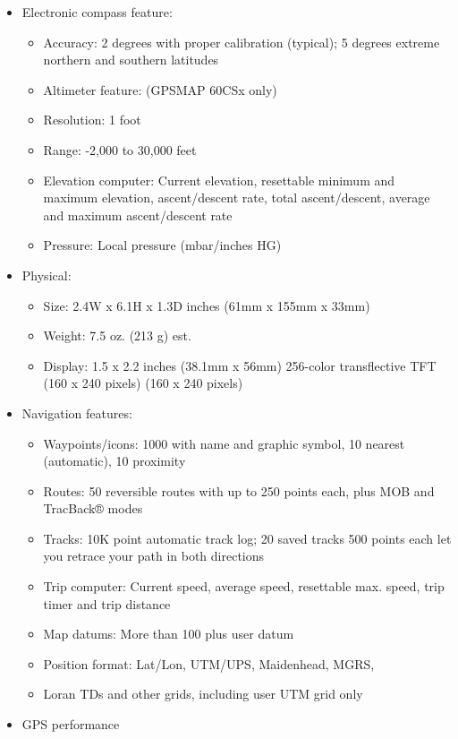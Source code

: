 \begin{itemize}
	\item Electronic compass feature:
		\begin{itemize}
			\item Accuracy: 2 degrees with proper calibration (typical); 5 degrees extreme northern and southern latitudes 
			\item Altimeter feature: (GPSMAP 60CSx only) 
			\item Resolution: 1 foot 
			\item Range: -2,000 to 30,000 feet 
			\item Elevation computer: Current elevation, resettable minimum and maximum elevation, ascent/descent rate, total ascent/descent, average and maximum ascent/descent rate 
			\item Pressure: Local pressure (mbar/inches HG) 
		\end{itemize}
	\item Physical:
		\begin{itemize}
			\item Size: 2.4W x 6.1H x 1.3D inches (61mm x 155mm x 33mm) 
			\item Weight: 7.5 oz. (213 g) est. 
			\item Display: 1.5 x 2.2 inches (38.1mm x 56mm) 256-color transflective TFT (160 x 240 pixels) (160 x 240 pixels) 
  		\end{itemize}
	\item Navigation features:
		\begin{itemize}
			\item Waypoints/icons: 1000 with name and graphic symbol, 10 nearest (automatic), 10 proximity 
			\item Routes: 50 reversible routes with up to 250 points each, plus MOB and TracBack® modes 
			\item Tracks: 10K point automatic track log; 20 saved tracks 500 points each let you retrace your path in both directions
			\item Trip computer: Current speed, average speed, resettable max. speed, trip timer and trip distance 
			\item Map datums: More than 100 plus user datum 
			\item Position format: Lat/Lon, UTM/UPS, Maidenhead, MGRS, 
			\item Loran TDs and other grids, including user UTM grid only 
		\end{itemize}
	\item GPS performance 
		\begin{itemize}

\end{itemize}
\end{itemize}
